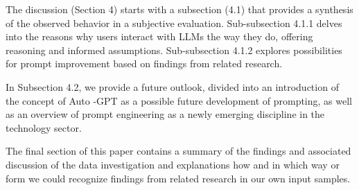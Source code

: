 The discussion (Section 4) starts with a subsection (4.1) that provides a synthesis of the
observed behavior in a subjective evaluation.
Sub-subsection 4.1.1 delves into the reasons why users interact with LLMs the way they do,
offering reasoning and informed assumptions.
Sub-subsection 4.1.2 explores possibilities for prompt improvement based on findings from related research.

In Subsection 4.2, we provide a future outlook, divided into an introduction of the concept of Auto
-GPT as a possible future development of prompting, as well as an overview of prompt engineering
as a newly emerging discipline in the technology sector.

The final section of this paper contains a summary of the findings and associated
discussion of the data investigation and explanations how and in which way or form we could recognize
findings from related research in our own input samples.
